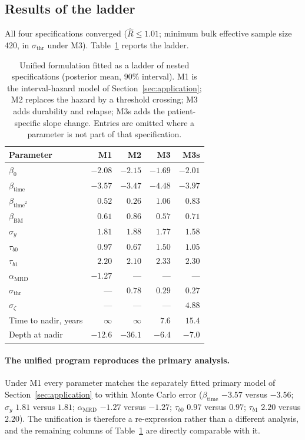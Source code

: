 \documentclass[11pt]{article}
\begin{document}
\subsection{Results of the ladder}

All four specifications converged ($\widehat R\le1.01$; minimum bulk effective
sample size 420, in $\sigma_{\mathrm{thr}}$ under M3). Table~\ref{tab:unified}
reports the ladder.

\begin{table}[!htbp]
\centering
\caption{Unified formulation fitted as a ladder of nested specifications
(posterior mean, $90\%$ interval). M1 is the interval-hazard model of
Section~\ref{sec:application}; M2 replaces the hazard by a threshold crossing;
M3 adds durability and relapse; M3s adds the patient-specific slope change.
Entries are omitted where a parameter is not part of that specification.}
\label{tab:unified}
\small
\begin{tabular}{lrrrr}
\toprule
Parameter & M1 & M2 & M3 & M3s\\
\midrule
$\beta_0$                 & $-2.08$ & $-2.15$ & $-1.69$ & $-2.01$\\
$\beta_{\mathrm{time}}$   & $-3.57$ & $-3.47$ & $-4.48$ & $-3.97$\\
$\beta_{\mathrm{time}^2}$ & $0.52$  & $0.26$  & $1.06$  & $0.83$\\
$\beta_{\mathrm{BM}}$     & $0.61$  & $0.86$  & $0.57$  & $0.71$\\
$\sigma_y$                & $1.81$  & $1.88$  & $1.77$  & $1.58$\\
$\tau_{b0}$               & $0.97$  & $0.67$  & $1.50$  & $1.05$\\
$\tau_{b1}$               & $2.20$  & $2.10$  & $2.33$  & $2.30$\\
$\alpha_{\mathrm{MRD}}$   & $-1.27$ & ---     & ---     & ---\\
$\sigma_{\mathrm{thr}}$   & ---     & $0.78$  & $0.29$  & $0.27$\\
$\sigma_\zeta$            & ---     & ---     & ---     & $4.88$\\
\midrule
Time to nadir, years      & $\infty$ & $\infty$ & $7.6$ & $15.4$\\
Depth at nadir            & $-12.6$ & $-36.1$ & $-6.4$ & $-7.0$\\
\bottomrule
\end{tabular}
\end{table}

\paragraph{The unified program reproduces the primary analysis.}
Under M1 every parameter matches the separately fitted primary model of
Section~\ref{sec:application} to within Monte Carlo error
($\beta_{\mathrm{time}}$ $-3.57$ versus $-3.56$; $\sigma_y$ $1.81$ versus
$1.81$; $\alpha_{\mathrm{MRD}}$ $-1.27$ versus $-1.27$; $\tau_{b0}$ $0.97$
versus $0.97$; $\tau_{b1}$ $2.20$ versus $2.20$). The unification is therefore
a re-expression rather than a different analysis, and the remaining columns of
Table~\ref{tab:unified} are directly comparable with it.
\end{document}
